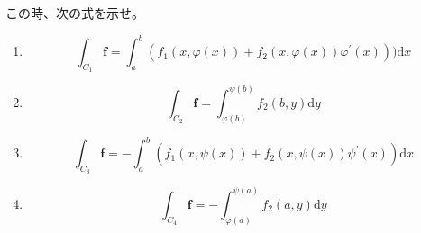 \documentclass[12pt,b5paper]{ltjsarticle}
\begin{document}
この時、次の式を示せ。
\begin{enumerate}
 \item
     \begin{equation}
      \int_{C_1}\bm{f}
       = \int_{a}^{b}(f_1(x,\varphi(x)) + f_2(x,\varphi(x))\varphi^{\prime}(x)))\mathrm{d}x
     \end{equation}
 \item
     \begin{equation}
      \int_{C_2}\bm{f}
       = \int_{\varphi(b)}^{\psi(b)}f_2(b,y)\mathrm{d}y
     \end{equation}
 \item
     \begin{equation}
      \int_{C_3}\bm{f}
       = - \int_{a}^{b}(f_1(x,\psi(x)) + f_2(x,\psi(x))\psi^{\prime}(x))\mathrm{d}x
     \end{equation}
 \item
     \begin{equation}
      \int_{C_4}\bm{f}
       = -\int_{\varphi(a)}^{\psi(a)}f_2(a,y)\mathrm{d}y
     \end{equation}
\end{enumerate}

\dotfill
\end{document}
